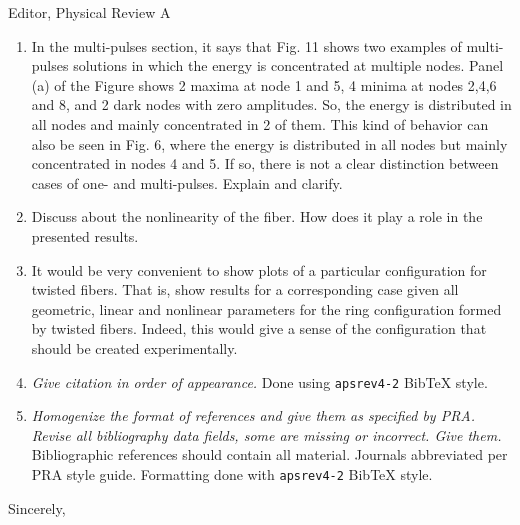 \documentclass[11pt]{letter}
\begin{document}
\begin{letter}{Editor, Physical Review A}
\begin{enumerate}
\item In the multi-pulses section, it says that Fig. 11 shows two examples of multi-pulses solutions in which the energy is concentrated at multiple nodes. Panel (a) of the Figure shows 2 maxima at node 1 and 5, 4 minima at nodes 2,4,6 and 8, and 2 dark nodes with zero amplitudes. So, the energy is distributed in all nodes and mainly concentrated in 2 of them. This kind of behavior can also be seen in Fig. 6, where the energy is distributed in all nodes but mainly concentrated in nodes 4 and 5. If so, there is not a clear distinction between cases of one- and multi-pulses. Explain and clarify.

\item Discuss about the nonlinearity of the fiber. How does it play a role in the presented results.

\item It would be very convenient to show plots of a particular configuration for twisted fibers. That is, show results for a corresponding case given all geometric, linear and nonlinear parameters for the ring configuration formed by twisted fibers. Indeed, this would give a sense of the configuration that should be created experimentally.

\item \emph{Give citation in order of appearance.} Done using \texttt{apsrev4-2} BibTeX style.

\item \emph{Homogenize the format of references and give them as specified by PRA. Revise all bibliography data fields, some are missing or incorrect. Give them.} Bibliographic references should contain all material. Journals abbreviated per PRA style guide. Formatting done with \texttt{apsrev4-2} BibTeX style.

\end{enumerate}

\closing{Sincerely,}

\end{letter}
\end{document}
